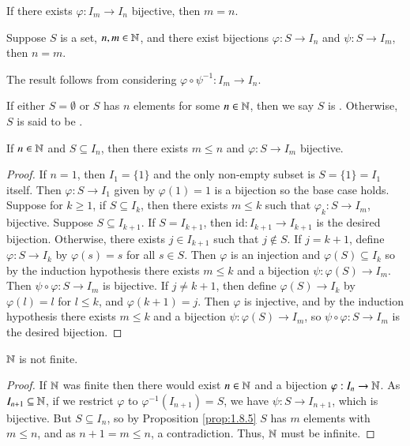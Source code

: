 \begin{corollary}\label{cor:1.8.3}
    If there exists $\varphi:I_m\rightarrow I_n$ bijective, then $m = n$.
\end{corollary}

\begin{corollary}\label{cor:1.8.4}
    Suppose $S$ is a set, $n,m \in \mathbb N$, and there exist bijections $\varphi:S\rightarrow I_n$ and $\psi:S\rightarrow I_m$, then $n = m$.
\end{corollary}

The result follows from considering $\varphi\circ \psi^{-1}:I_m\rightarrow I_n$.

\begin{definition}
    If either $S = \emptyset$ or $S$ has $n$ elements for some $n \in \mathbb N$, then we say $S$ is . Otherwise, $S$ is said to be .
\end{definition}

\begin{proposition}\label{prop:1.8.5}
    If $n \in \mathbb N$ and $S \subseteq I_n$, then there exists $m \leq n$ and $\varphi:S\rightarrow I_m$ bijective.
\end{proposition}
\begin{proof}
    If $n = 1$, then $I_1 = \{1\}$ and the only non-empty subset is $S = \{1\} = I_1$ itself. Then $\varphi:S\rightarrow I_1$ given by $\varphi(1) = 1$ is a bijection so the base case holds. Suppose for $k \geq 1$, if $S \subseteq I_k$, then there exists $m \leq k$ such that $\varphi_k:S\rightarrow I_m$, bijective. Suppose $S \subseteq I_{k+1}$. If $S = I_{k+1}$, then $\text{id}:I_{k+1}\rightarrow I_{k+1}$ is the desired bijection. Otherwise, there exists $j \in I_{k+1}$ such that $j \notin S$. If $j = k+1$, define $\varphi:S\rightarrow I_k$ by $\varphi(s) = s$ for all $s \in S$. Then $\varphi$ is an injection and $\varphi(S) \subseteq I_k$ so by the induction hypothesis there exists $m \leq k$ and a bijection $\psi:\varphi(S)\rightarrow I_m$. Then $\psi\circ \varphi:S\rightarrow I_m$ is bijective. If $j \neq k+1$, then define $\varphi(S)\rightarrow I_k$ by $\varphi(l) = l$ for $l \leq k$, and $\varphi(k+1) = j$. Then $\varphi$ is injective, and by the induction hypothesis there exists $m \leq k$ and a bijection $\psi:\varphi(S)\rightarrow I_m$, so $\psi\circ\varphi:S\rightarrow I_m$ is the desired bijection.
\end{proof}

\begin{proposition}\label{prop:1.8.6}
    $\mathbb N$ is not finite.
\end{proposition}
\begin{proof}
    If $\mathbb N$ was finite then there would exist $n \in \mathbb N$ and a bijection $\varphi:I_n\rightarrow \mathbb N$. As $I_{n+1} \subseteq \mathbb N$, if we restrict $\varphi$ to $\varphi^{-1}(I_{n+1}) = S$, we have $\psi:S\rightarrow I_{n+1}$, which is bijective. But $S\subseteq I_n$, so by Proposition \ref{prop:1.8.5} $S$ has $m$ elements with $m \leq n$, and as $n+1 = m \leq n$, a contradiction. Thus, $\mathbb N$ must be infinite.
\end{proof}

